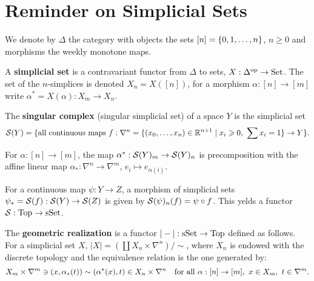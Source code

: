 \section{Reminder on Simplicial Sets}

We denote by $\Delta$ the category with objects the sets $[n]=\cb{0,1,\dots,n}$, $n\geq 0$ and morphisms the weekly monotone maps.

A \textbf{simplicial set} is a contravariant functor from $\Delta$ to sets, $X:\Delta^\op \to\Set$. The set of the $n$-simplices is denoted $X_n=X([n])$, for a morphism $\alpha:[n]\to[m]$ write $\alpha^*=X(\alpha):X_m\to X_n$.

The \textbf{singular complex} (singular simplicial set) of a space $Y$ is the simplicial set \[\S(Y)=\{\text{all continuous maps }f:\nabla^n=\cb{(\xso)\in\R^{n+1}\mid x_i\geq0,\ \sum x_i=1}\to Y\}.\]

For $\alpha: [n]\to [m]$, the map $\alpha^*:\S(Y)_m\to\S(Y)_n$ is precomposition with the affine linear map $\alpha_*:\nabla^n\to\nabla^m$, $e_i\mapsto e_{\alpha(i)}$. 

For a continuous map $\psi:Y\to Z$, a morphism of simplicial sets $\psi_*=\S(f):\S(Y)\to\S(Z)$ is given by $\S(\psi)_n(f)=\psi\circ f$. This yelds a functor $\S:\Top\to\sSet$.

The \textbf{geometric realization} is a functor $|-|:\sSet\to\Top$ defined as follows. For a simplicial set $X$, $|X|=(\coprod X_n\times\nabla^n)/\sim$, where $X_n$ is endowed with the discrete topology and the equivalence relation is the one generated by:\normalmarginpar{}
\[X_m\times\nabla^m\cont(x,\alpha_*(t))\sim(\alpha^*(x),t)\in X_n\times\nabla^n\quad\text{for all }\alpha:[n]\to[m],\ x\in X_m,\ t\in\nabla^m.\]

\reversemarginpar
